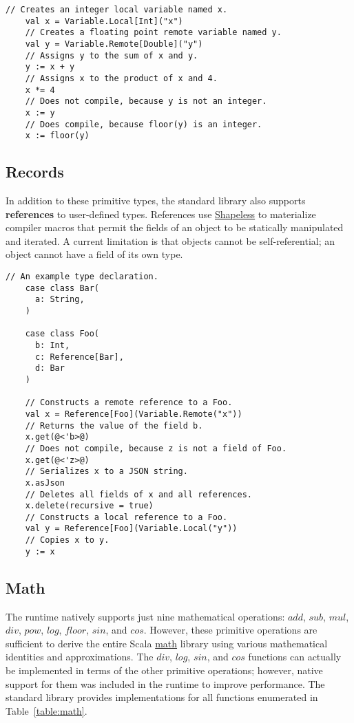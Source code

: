 \documentclass[../main.tex]{subfiles}
\begin{document}
  \begin{lstlisting}[style=Scala]
    // Creates an integer local variable named x.
    val x = Variable.Local[Int]("x")
    // Creates a floating point remote variable named y.
    val y = Variable.Remote[Double]("y")
    // Assigns y to the sum of x and y.
    y := x + y
    // Assigns x to the product of x and 4.
    x *= 4
    // Does not compile, because y is not an integer.
    x := y
    // Does compile, because floor(y) is an integer.
    x := floor(y)
  \end{lstlisting}

  \subsection{Records}
  In addition to these primitive types, the standard library also supports \textbf{references} to
  user-defined types. References use \href{https://github.com/milessabin/shapeless}{Shapeless} to
  materialize compiler macros that permit the fields of an object to be statically manipulated and
  iterated. A current limitation is that objects cannot be self-referential; an object cannot have a
  field of its own type.

  \begin{lstlisting}[style=Scala]
    // An example type declaration.
    case class Bar(
      a: String,
    )

    case class Foo(
      b: Int,
      c: Reference[Bar],
      d: Bar
    )

    // Constructs a remote reference to a Foo.
    val x = Reference[Foo](Variable.Remote("x"))
    // Returns the value of the field b.
    x.get(@<'b>@)
    // Does not compile, because z is not a field of Foo.
    x.get(@<'z>@)
    // Serializes x to a JSON string.
    x.asJson
    // Deletes all fields of x and all references.
    x.delete(recursive = true)
    // Constructs a local reference to a Foo.
    val y = Reference[Foo](Variable.Local("y"))
    // Copies x to y.
    y := x
  \end{lstlisting}

  \subsection{Math}
  The runtime natively supports just nine mathematical operations: $add$, $sub$, $mul$, $div$,
  $pow$, $log$, $floor$, $sin$, and $cos$. However, these primitive operations are sufficient to
  derive the entire Scala \href{https://www.scala-lang.org/api/2.12.1/scala/math/index.html}{math}
  library using various mathematical identities and approximations. The $div$, $log$, $sin$, and
  $cos$ functions can actually be implemented in terms of the other primitive operations; however,
  native support for them was included in the runtime to improve performance. The standard library
  provides implementations for all functions enumerated in Table~\ref{table:math}.
\end{document}

